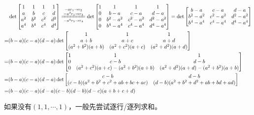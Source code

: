                 \begin{solution}
                    \begin{align*}
                             &\det\begin{bmatrix}1&1&1&1\\a&b&c&d\\a^2&b^2&c^2&d^2\\a^4&b^4&c^4&d^4\end{bmatrix}\xlongequal[-a^4 r_1\rightarrow r_4]{\substack{-ar_1\rightarrow r_2\\-a^2 r_1\rightarrow r_3}}\det\begin{bmatrix}1&1&1&1\\0&b-a&c-a&d-a\\0&b^2-a^2&c^2-a^2&d^2-a^2\\0&b^4-a^4&c^4-a^4&d^4-a^4\end{bmatrix}=\det\begin{bmatrix}b-a&c-a&d-a\\b^2-a^2&c^2-a^2&d^2-a^2\\b^4-a^4&c^4-a^4&d^4-a^4\end{bmatrix} \\
                            =&(b-a)(c-a)(d-a)\det\begin{bmatrix}1&1&1\\a+b&a+c&a+d\\(a^2+b^2)(a+b)&(a^2+c^2)(a+c)&(a^2+d^2)(a+d)\end{bmatrix} \\
                            =&(b-a)(c-a)(d-a)\det\begin{bmatrix}1&1&1\\0&c-b&d-b\\0&(a^2+c^2)(a+c)-(a^2+b^2)(a+b)&(a^2+d^2)(a+d)-(a^2+b^2)(a+b)\end{bmatrix} \\
                            =&(b-a)(c-a)(d-a)\det\begin{bmatrix}c-b&d-b\\(c-b)(a^2+b^2+c^2+ab+bc+ac)&(d-b)(a^2+b^2+d^2+ab+bd+ad)\end{bmatrix} \\
                            =&(b-a)(c-a)(d-a)(c-b)(d-b)(d-c)(a+b+c+d)
                    \end{align*}
                \end{solution}

                \begin{note}
                    如果没有$(1,1,\cdots,1)$，一般先尝试逐行/逐列求和。
                \end{note}

